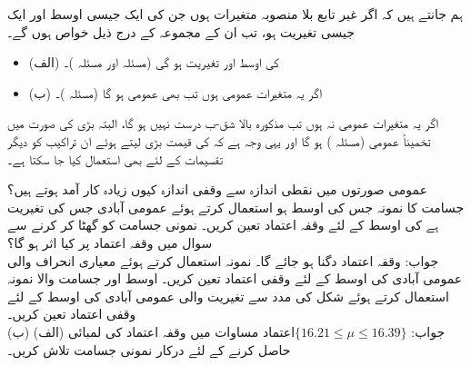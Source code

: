 ہم جانتے ہیں کہ اگر  غیر تابع بلا منصوبہ متغیرات ہوں جن کی ایک جیسی اوسط  اور ایک جیسی تغیریت  ہو، تب ان کے مجموعہ  کے درج ذیل خواص ہوں گے۔
\begin{itemize}
\item{(الف)}
 کی اوسط  اور تغیریت  ہو گی (مسئلہ  اور  مسئلہ )۔
\item{(ب)}
اگر یہ متغیرات عمومی ہوں تب  بھی عمومی ہو گا (مسئلہ )۔
\end{itemize}

اگر یہ متغیرات عمومی نہ ہوں تب مذکورہ بالا  شق-ب درست نہیں ہو گا، البتہ بڑی  کی صورت میں  تخمیناً عمومی  (مسئلہ ) ہو گا اور یہی وجہ ہے کہ  کی قیمت بڑی لیتے ہوئے  ان تراکیب  کو دیگر تقسیمات کے لئے بھی  استعمال کیا جا سکتا ہے۔

\quad
عمومی صورتوں میں نقطی اندازہ سے وقفی اندازہ کیوں زیادہ کار آمد ہوتے ہیں؟   
\quad
{} جسامت کا نمونہ جس کی اوسط  ہو استعمال کرتے ہوئے  عمومی آبادی جس کی تغیریت  ہے کی اوسط  کے لئے  وقفہ اعتماد تعین کریں۔
\quad
نمونی جسامت کو گھٹا کر  کرنے سے سوال  میں وقفہ اعتماد  پر کیا اثر ہو گا؟\\
جواب:\quad
وقفہ اعتماد دگنا ہو جائے گا۔
\quad
نمونہ  استعمال کرتے ہوئے معیاری انحراف  والی عمومی آبادی کی اوسط کے لئے  وقفی اعتماد تعین کریں۔ 
\quad
اوسط  اور جسامت   والا نمونہ استعمال کرتے ہوئے  شکل  کی مدد سے تغیریت  والی عمومی آبادی کی اوسط کے لئے  وقفی اعتماد تعین کریں۔\\
جواب:\quad
$\text{اعتماد} \{16.21\le \mu\le 16.39\}$
\quad
مساوات  میں  وقفہ اعتماد کی لمبائی (الف)  (ب)  حاصل کرنے  کے لئے درکار نمونی جسامت  تلاش کریں۔

